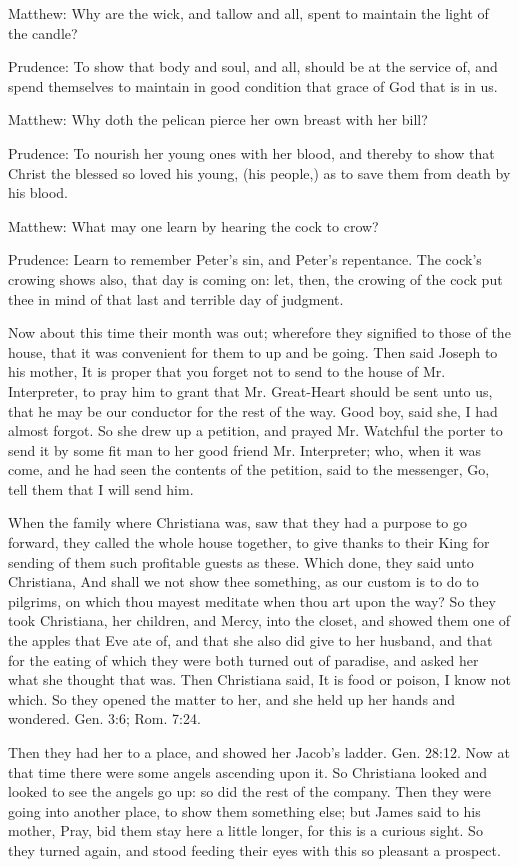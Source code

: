 Matthew: Why are the wick, and tallow and all, spent to maintain the light of the candle?

Prudence: To show that body and soul, and all, should be at the service of, and spend themselves to maintain in good condition that grace of God that is in us.

Matthew: Why doth the pelican pierce her own breast with her bill?

Prudence: To nourish her young ones with her blood, and thereby to show that Christ the blessed so loved his young, (his people,) as to save them from death by his blood.

Matthew: What may one learn by hearing the cock to crow?

Prudence: Learn to remember Peter's sin, and Peter's repentance. The cock's crowing shows also, that day is coming on: let, then, the crowing of the cock put thee in mind of that last and terrible day of judgment.

Now about this time their month was out; wherefore they signified to those of the house, that it was convenient for them to up and be going. Then said Joseph to his mother, It is proper that you forget not to send to the house of Mr. Interpreter, to pray him to grant that Mr. Great-Heart should be sent unto us, that he may be our conductor for the rest of the way. Good boy, said she, I had almost forgot. So she drew up a petition, and prayed Mr. Watchful the porter to send it by some fit man to her good friend Mr. Interpreter; who, when it was come, and he had seen the contents of the petition, said to the messenger, Go, tell them that I will send him.

When the family where Christiana was, saw that they had a purpose to go forward, they called the whole house together, to give thanks to their King for sending of them such profitable guests as these. Which done, they said unto Christiana, And shall we not show thee something, as our custom is to do to pilgrims, on which thou mayest meditate when thou art upon the way? So they took Christiana, her children, and Mercy, into the closet, and showed them one of the apples that Eve ate of, and that she also did give to her husband, and that for the eating of which they were both turned out of paradise, and asked her what she thought that was. Then Christiana said, It is food or poison, I know not which. So they opened the matter to her, and she held up her hands and wondered. Gen. 3:6; Rom. 7:24.

Then they had her to a place, and showed her Jacob's ladder. Gen. 28:12. Now at that time there were some angels ascending upon it. So Christiana looked and looked to see the angels go up: so did the rest of the company. Then they were going into another place, to show them something else; but James said to his mother, Pray, bid them stay here a little longer, for this is a curious sight. So they turned again, and stood feeding their eyes with this so pleasant a prospect.

